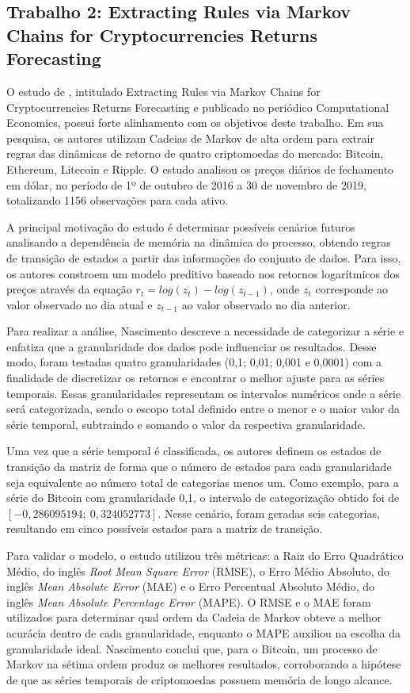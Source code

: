 \documentclass[
    12pt,                %
    openright,           %
    oneside,             %
    a4paper,             %
    english,             %
    brazil               %
]{abntex2}
\begin{document}
\subsection{Trabalho 2: Extracting Rules via Markov Chains for Cryptocurrencies Returns Forecasting}

O estudo de , intitulado Extracting Rules via Markov Chains for Cryptocurrencies Returns Forecasting e publicado no periódico Computational 
Economics, possui forte alinhamento com os objetivos deste trabalho. Em sua pesquisa, os autores utilizam Cadeias de Markov de alta ordem para extrair regras das 
dinâmicas de retorno de quatro criptomoedas do mercado: Bitcoin, Ethereum, Litecoin e Ripple. O estudo analisou os preços diários de fechamento em dólar, no período de 
1º de outubro de 2016 a 30 de novembro de 2019, totalizando 1156 observações para cada ativo.

A principal motivação do estudo é determinar possíveis cenários futuros analisando a dependência de memória na dinâmica do processo, obtendo regras de transição de 
estados a partir das informações do conjunto de dados. Para isso, os autores constroem um modelo preditivo baseado nos retornos logarítmicos dos preços através da 
equação $r_t = log(z_t) - log(z_{t-1})$, onde $z_t$ corresponde ao valor observado no dia atual e $z_{t-1}$ ao valor observado no dia anterior.

Para realizar a análise, Nascimento descreve a necessidade de categorizar a série e enfatiza que a granularidade dos dados pode influenciar os resultados. Desse modo, 
foram testadas quatro granularidades (0,1; 0,01; 0,001 e 0,0001) com a finalidade de discretizar os retornos e encontrar o melhor ajuste para as séries temporais. 
Essas granularidades representam os intervalos numéricos onde a série será categorizada, sendo o escopo total definido entre o menor e o maior valor da série temporal, subtraindo e somando o valor da respectiva granularidade.

Uma vez que a série temporal é classificada, os autores definem os estados de transição da matriz de forma que o número de estados para cada granularidade seja equivalente ao número total de categorias menos um. Como exemplo, para a série do Bitcoin com granularidade 0,1, o intervalo de categorização obtido foi de $[-0{,}286095194;\ 0{,}324052773]$. Nesse cenário, foram geradas seis categorias, resultando em cinco possíveis estados para a matriz de transição.

Para validar o modelo, o estudo utilizou três métricas: a Raiz do Erro Quadrático Médio, do inglês \textit{Root Mean Square Error} (RMSE), o Erro Médio Absoluto, do inglês \textit{Mean Absolute Error} (MAE) e o Erro Percentual Absoluto Médio, do inglês \textit{Mean Absolute Percentage Error} (MAPE). O RMSE e o MAE foram utilizados para determinar qual ordem da Cadeia de Markov obteve a melhor acurácia dentro de cada granularidade, enquanto o MAPE auxiliou na escolha da granularidade ideal. Nascimento conclui que, para o Bitcoin, um processo de Markov na sétima ordem produz os melhores resultados, corroborando a hipótese de que as séries temporais de criptomoedas possuem memória de longo alcance.
\end{document}
